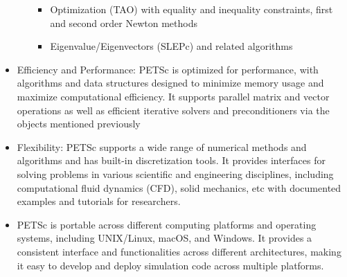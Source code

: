 \begin{itemize}
\begin{itemize}
\begin{itemize}
                \item Optimization (TAO) with equality and inequality constraints, first and second order Newton methods
                \item Eigenvalue/Eigenvectors (SLEPc) and related algorithms
            \end{itemize}
    \end{itemize}
    \item Efficiency and Performance: PETSc is optimized for performance, with algorithms and data structures designed to minimize memory usage and maximize computational efficiency. It supports parallel matrix and vector operations as well as efficient iterative solvers and preconditioners via the objects mentioned previously 
    \item Flexibility: PETSc supports a wide range of numerical methods and algorithms and has built-in discretization tools. It provides interfaces for solving problems in various scientific and engineering disciplines, including computational fluid dynamics (CFD), solid mechanics, etc with documented examples and tutorials for researchers.
    \item PETSc is portable across different computing platforms and operating systems, including UNIX/Linux, macOS, and Windows. It provides a consistent interface and functionalities across different architectures, making it easy to develop and deploy simulation code across multiple platforms.
\end{itemize}